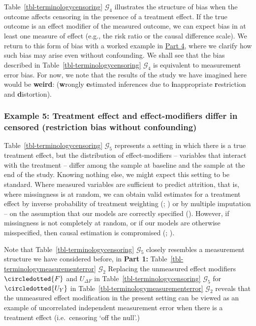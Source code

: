 \documentclass[
  single column]{article}
\begin{document}
Table~\ref{tbl-terminologycensoring} \(\mathcal{G}_4\) illustrates the
structure of bias when the outcome affects censoring in the presence of
a treatment effect. If the true outcome is an effect modifier of the
measured outcome, we can expect bias in at least one measure of effect
(e.g., the risk ratio or the causal difference scale). We return to this
form of bias with a worked example in \hyperref[id-sec-4]{Part 4}, where
we clarify how such bias may arise even without confounding. We shall
see that the bias described in Table~\ref{tbl-terminologycensoring}
\(\mathcal{G}_4\) is equivalent to measurement error bias. For now, we
note that the results of the study we have imagined here would be
\textbf{weird}: (\textbf{w}rongly \textbf{e}stimated inferences due to
\textbf{i}nappropriate \textbf{r}estriction and \textbf{d}istortion).

\subsubsection{Example 5: Treatment effect and effect-modifiers differ
in censored (restriction bias without
confounding)}\label{example-5-treatment-effect-and-effect-modifiers-differ-in-censored-restriction-bias-without-confounding}

Table~\ref{tbl-terminologycensoring} \(\mathcal{G}_5\) represents a
setting in which there is a true treatment effect, but the distribution
of effect-modifiers -- variables that interact with the treatment --
differ among the sample at baseline and the sample at the end of the
study. Knowing nothing else, we might expect this setting to be
standard. Where measured variables are sufficient to predict attrition,
that is, where missingness is at random, we can obtain valid estimates
for a treatment effect by inverse probability of treatment weighting
(;
) or by multiple
imputation -- on the assumption that our models are correctly specified
(). However, if
missingness is not completely at random, or if our models are otherwise
misspecified, then causal estimation is compromised
(;
).

Note that Table~\ref{tbl-terminologycensoring} \(\mathcal{G}_5\) closely
resembles a measurement structure we have considered before, in
\textbf{Part 1:} Table~\ref{tbl-terminologymeasurementerror}
\(\mathcal{G}_2\) Replacing the unmeasured effect modifiers
\(\circledotted{F}\) and \(U_{\Delta F}\) in
Table~\ref{tbl-terminologycensoring} \(\mathcal{G}_5\) for
\(\circledotted{U_Y}\) in Table~\ref{tbl-terminologymeasurementerror}
\(\mathcal{G}_2\) reveals that the unmeasured effect modification in the
present setting can be viewed as an example of uncorrelated independent
measurement error when there is a treatment effect (i.e.~censoring `off
the null'.)
\end{document}

